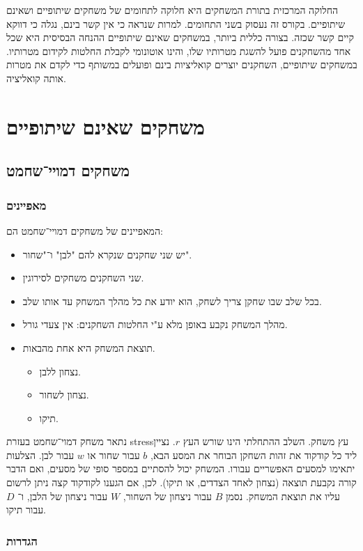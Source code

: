 \documentclass[a4paper,10pt,twoside,openany]{book}
\begin{document}
החלוקה המרכזית בתורת המשחקים היא חלוקה לתחומים של משחקים שיתופיים ושאינם שיתופיים.
בקורס זה נעסוק בשני התחומים. למרות שנראה כי אין קשר בינם, נגלה כי דווקא קיים קשר שכזה.
בצורה כללית ביותר, במשחקים שאינם שיתופיים ההנחה הבסיסית היא שכל אחד מהשחקנים פועל להשגת מטרותיו שלו, והינו אוטונומי לקבלת החלטות לקידום מטרותיו.
במשחקים שיתופיים, השחקנים יוצרים קואליציות בינם ופועלים במשותף כדי לקדם את מטרות אותה קואליציה.

\mainmatter

\part{משחקים שאינם שיתופיים}

\chapter{משחקים דמויי־שחמט}

\section{מאפיינים}

המאפיינים של משחקים דמויי־שחמט הם:
\begin{itemize}
\item יש שני שחקנים
שנקרא להם "לבן" ו־"שחור".
\item שני השחקנים משחקים לסירוגין.
\item בכל שלב שבו שחקן צריך לשחק, הוא יודע את כל מהלך המשחק עד אותו שלב.
\item מהלך המשחק נקבע באופן מלא ע"י החלטות השחקנים: אין צעדי גורל.
\item תוצאת המשחק היא אחת מהבאות.
\begin{itemize}
\item נצחון ללבן.
\item נצחון לשחור.
\item תיקו.
\end{itemize}
\end{itemize}

נתאר משחק דמוי־שחמט בעזרת
stress{עץ משחק}.
השלב ההתחלתי הינו שורש העץ
$r$.
נציין ליד כל קודקוד את זהות השחקן הבוחר את המסע הבא,
$b$
עבור שחור או
$w$
עבור לבן.
הצלעות יתאימו למסעים האפשריים עבורו.
המשחק יכול להסתיים במספר סופי של מסעים, ואם הדבר קורה נקבעת תוצאה (נצחון לאחד הצדדים, או תיקו). לכן, אם הגענו לקודקוד קצה ניתן לרשום עליו את תוצאת המשחק. נסמן
$B$
עבור ניצחון של השחור,
$W$
עבור ניצחון של הלבן, ו־%
$D$
עבור תיקו.

\section{הגדרות}
\end{document}
